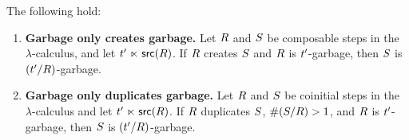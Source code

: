\begin{lemma}
\label{garbage_only_creates_garbage_proof}
\label{garbage_only_duplicates_garbage_proof}
The following hold:
\begin{enumerate}
\item {\bf Garbage only creates garbage.}
  Let $R$ and $S$ be composable steps in the $\lambda$-calculus,
  and let $t' \mathrel{\ltimes} \mathsf{src}(R)$.
  If $R$ creates $S$ and $R$ is $t'$-garbage,
  then $S$ is $(t'/R)$-garbage.
\item {\bf Garbage only duplicates garbage.}
  Let $R$ and $S$ be coinitial steps in the $\lambda$-calculus
  and let $t' \mathrel{\ltimes} \mathsf{src}(R)$.
  If $R$ duplicates $S$, \ie $\#(S/R) > 1$,
  and $R$ is $t'$-garbage,
  then $S$ is $(t'/R)$-garbage.
\end{enumerate}
\end{lemma}
